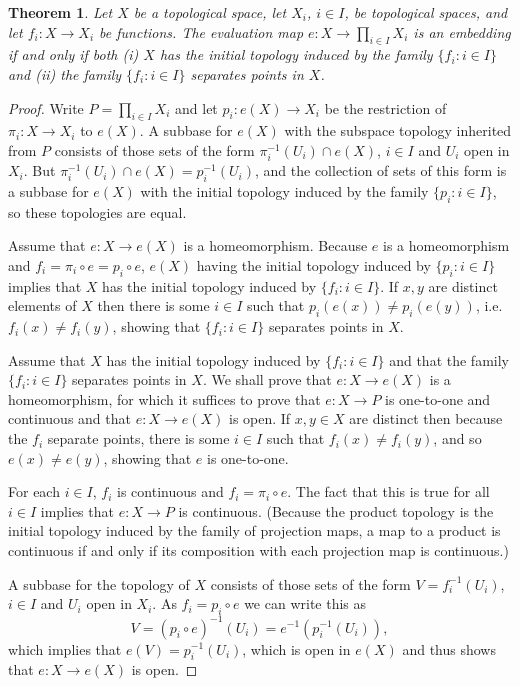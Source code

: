 \documentclass{article}
\newtheorem{theorem}{Theorem}
\theoremstyle{definition}
\begin{document}
\begin{theorem}
Let $X$ be a topological space, let $X_i$, $i \in I$, be topological spaces, and let
$f_i:X \to X_i$ be functions. The evaluation map $e:X \to \prod_{i \in I} X_i$ is an embedding
if and only if both (i) $X$ has the initial topology induced by the family $\{f_i: i \in I\}$ and
(ii) the family $\{f_i: i \in I\}$ separates points in $X$.
\label{812}
\end{theorem}
\begin{proof}
Write $P=\prod_{i \in I} X_i$ and let $p_i:e(X) \to X_i$ be the restriction of $\pi_i:X \to X_i$ to $e(X)$.
A subbase for  $e(X)$ with the subspace topology inherited from $P$ consists of those sets of the form $\pi_i^{-1}(U_i) \cap e(X)$, $i \in I$ and $U_i$ open in $X_i$. 
But $\pi_i^{-1}(U_i) \cap e(X) = p_i^{-1}(U_i)$, and the collection of  sets of this form is a subbase for $e(X)$ with the initial
topology induced by the family $\{p_i: i \in I\}$, so these topologies are equal.

Assume that $e:X \to e(X)$ is a homeomorphism. Because $e$ is a homeomorphism and 
$f_i=\pi_i \circ e=p_i \circ e$, $e(X)$ having the initial topology induced by $\{p_i : i \in I\}$
implies that $X$ has the initial topology induced by $\{f_i : i \in I\}$. 
If $x,y$ are distinct elements of $X$ then there is some $i \in I$ such that $p_i(e(x)) \neq p_i(e(y))$, i.e.
$f_i(x) \neq f_i(y)$, showing that $\{f_i : i \in I\}$ separates points in $X$.

Assume that $X$ has the initial topology induced by $\{f_i : i \in I\}$ and that the family $\{f_i: i \in I\}$
separates points in $X$. We shall prove that $e:X \to e(X)$ is a homeomorphism, for which it suffices to prove that
$e:X \to P$ is one-to-one and continuous and that $e:X \to e(X)$ is open.
If $x,y \in X$ are distinct then because the $f_i$ separate points, there is some $i \in I$ such that $f_i (x) \neq f_i(y)$, and so 
$e(x) \neq e(y)$, showing that $e$ is one-to-one.

For each $i \in I$, $f_i$ is continuous and $f_i = \pi_i \circ e$. The fact that this is true for all
$i \in I$ implies that $e:X \to P$ is continuous. (Because the product topology is the initial topology induced by the family of projection maps,
a map to a product is continuous if and only if its composition with each projection map is continuous.)

A subbase for the topology of $X$ consists of those sets of the form $V=f_i^{-1}(U_i)$, $i \in I$ and $U_i$ open in $X_i$. 
As $f_i = p_i \circ e$ we can write this as
\[
V = (p_i \circ e)^{-1}(U_i) = e^{-1}(p_i^{-1}(U_i)),
\]
which implies that $e(V) = p_i^{-1}(U_i)$, which is open in $e(X)$ and thus shows that $e:X \to e(X)$ is open. 
\end{proof}
\end{document}
